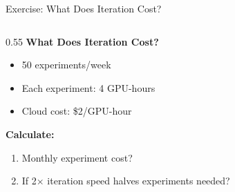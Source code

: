 \documentclass[aspectratio=169, 12pt]{beamer}
\begin{document}
\begin{frame}{Exercise: What Does Iteration Cost?}
\note{
%
%
%
%
}

\footnotesize
\begin{columns}[T]
  \begin{column}{0.55\textwidth}
    {\normalsize\bfseries What Does Iteration Cost?}

    \vspace{0.1cm}
    \begin{itemize}\setlength\itemsep{0pt}
      \item 50 experiments/week
      \item Each experiment: 4 GPU-hours
      \item Cloud cost: \$2/GPU-hour
    \end{itemize}

    \vspace{0.1cm}
    \textbf{Calculate:}
    \begin{enumerate}\setlength\itemsep{0pt}
      \item Monthly experiment cost?
      \item If 2$\times$ iteration speed halves experiments needed?
    \end{enumerate}


\end{column}
\end{columns}
\end{frame}
\end{document}
